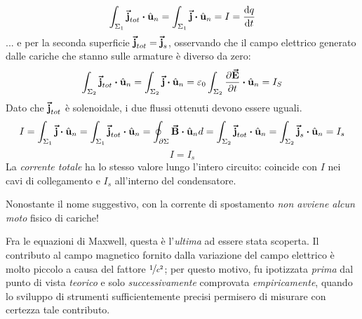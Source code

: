 \begin{equation*}
	\int_{\Sigma_1}\vba{j}_{tot}\vdot\vbh{u}_n=\int_{\Sigma_1}\vba{j}\vdot\vbh{u}_n=I=\dv{q}{t}
\end{equation*}
... e per la seconda superficie $\vb*{\va{j}}_{tot}=\vb*{\va{j}}_s$, osservando che il campo elettrico generato dalle cariche che stanno sulle armature è diverso da zero:
\begin{equation*}
	\int_{\Sigma_2}\vba{j}_{tot}\vdot\vbh{u}_n=\int_{\Sigma_2}\vba{j}\vdot\vbh{u}_n=\epsilon_0\int_{\Sigma_2}\pdv{\vba{E}}{t}\vdot\vbh{u}_n=I_S
\end{equation*}
Dato che $\vb*{\va{j}}_{tot}$ è solenoidale, i due flussi ottenuti devono essere uguali.
\begin{equation*}
	I=\int_{\Sigma_1}\vba{j}\vdot\vbh{u}_n=\int_{\Sigma_1}\vba{j}_{tot}\vdot\vbh{u}_n=\oint_{\partial \Sigma}\vba{B}\vdot\vbh{u}_nd=\int_{\Sigma_2}\vba{j}_{tot}\vdot\vbh{u}_n=\int_{\Sigma_2}\vba{j}_{s}\vdot\vbh{u}_n=I_s
\end{equation*}
\begin{equation}
	I=I_s
\end{equation}
La \textit{corrente totale} ha lo stesso valore lungo l'intero circuito: coincide con $I$ nei cavi di collegamento e $I_s$ all'interno del condensatore.
\begin{attention}
	Nonostante il nome suggestivo, con la corrente di spostamento \textit{non avviene alcun moto} fisico di cariche!
\end{attention}
\begin{digression}
	Fra le equazioni di Maxwell, questa è l'\textit{ultima} ad essere stata scoperta. Il contributo al campo magnetico fornito dalla variazione del campo elettrico è molto piccolo a causa del fattore $\nicefrac{1}{c^2}$; per questo motivo, fu ipotizzata \textit{prima} dal punto di vista \textit{teorico} e solo \textit{successivamente}  comprovata \textit{empiricamente}, quando lo sviluppo di strumenti sufficientemente precisi permisero di misurare con certezza tale contributo.
\end{digression}
